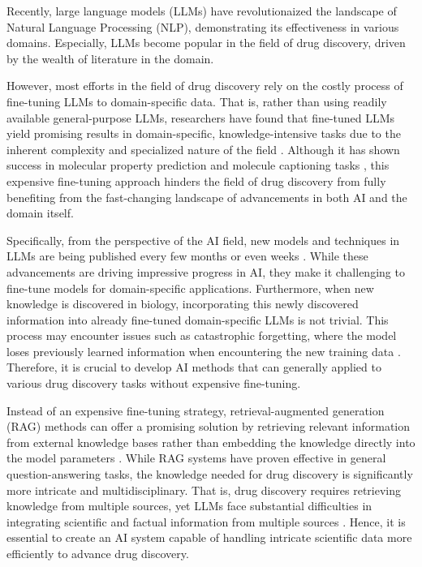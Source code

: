 Recently, large language models (LLMs) have revolutionaized the landscape of Natural Language Processing (NLP), demonstrating its effectiveness in various domains.
Especially, LLMs become popular in the field of drug discovery, driven by the wealth of literature in the domain.

However, most efforts in the field of drug discovery rely on the costly process of fine-tuning LLMs to domain-specific data. 
That is, rather than using readily available general-purpose LLMs, researchers have found that fine-tuned LLMs yield promising results in domain-specific, knowledge-intensive tasks due to the inherent complexity and specialized nature of the field \cite{lee2020biobert,edwards2024molcap}.
Although it has shown success in molecular property prediction \cite{zhao2023gimlet} and molecule captioning tasks \cite{edwards2022translation}, this expensive fine-tuning approach hinders the field of drug discovery from fully benefiting from the fast-changing landscape of advancements in both AI and the domain itself.

Specifically, from the perspective of the AI field, new models and techniques in LLMs are being published every few months or even weeks \cite{minaee2024large,zhao2023survey}. 
While these advancements are driving impressive progress in AI, they make it challenging to fine-tune models for domain-specific applications. 
Furthermore, when new knowledge is discovered in biology, incorporating this newly discovered information into already fine-tuned domain-specific LLMs is not trivial. 
This process may encounter issues such as catastrophic forgetting, where the model loses previously learned information when encountering the new training data \cite{luo2023empirical}.
Therefore, it is crucial to develop AI methods that can generally applied to various drug discovery tasks without expensive fine-tuning.


Instead of an expensive fine-tuning strategy, retrieval-augmented generation (RAG) methods can offer a promising solution by retrieving relevant information from external knowledge bases rather than embedding the knowledge directly into the model parameters \cite{gao2023retrieval}.
While RAG systems have proven effective in general question-answering tasks, the knowledge needed for drug discovery is significantly more intricate and multidisciplinary. 
That is, drug discovery requires retrieving knowledge from multiple sources, yet LLMs face substantial difficulties in integrating scientific and factual information from multiple sources \cite{harris2023large}.
Hence, it is essential to create an AI system capable of handling intricate scientific data more efficiently to advance drug discovery.

